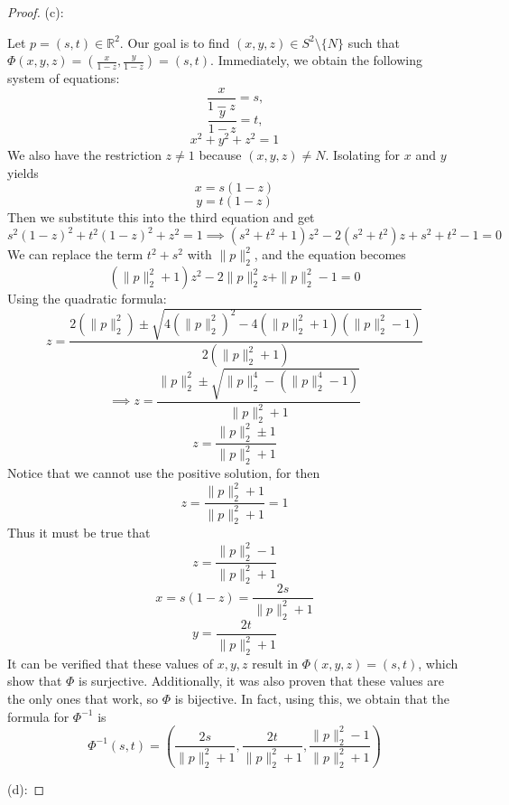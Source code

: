 \documentclass{article}
\theoremstyle{plain} %
\numberwithin{thm}{section} %
\theoremstyle{definition}
\begin{document}
\begin{proof}
            (c):

            Let \(p = (s,t) \in \mathbb{R}^2\). Our goal is to find \((x,y,z) \in S^2 \setminus \{N\}\) such that \(\Phi (x,y,z) = \left( \frac{x}{1-z}, \frac{y}{1-z} \right) = (s,t)\). Immediately, we obtain the following system of equations:
            \[
                \frac{x}{1-z} = s \text{,} 
            \]
            \[
                \frac{y}{1-z} = t \text{,} 
            \]
            \[
                x^2 + y^2 + z^2 = 1
            \]
            We also have the restriction \(z\neq 1\) because \((x,y,z) \neq N\). Isolating for \(x\) and \(y\) yields
            \[
                x=s(1-z)
            \]
            \[
                y=t(1-z)
            \]
            Then we substitute this into the third equation and get
            \[
                s^2(1-z)^2 + t^2(1-z)^2 + z^2 = 1 \implies (s^2 + t^2 + 1)z^2 - 2(s^2 + t^2)z + s^2 + t^2 - 1 = 0
            \]
            We can replace the term \(t^2 + s^2\) with \(\|p\| _2 ^2\), and the equation becomes
            \[
                (\|p\| _2 ^2 + 1)z^2 - 2\|p\| _2 ^2 z + \|p\| _2 ^2 - 1 = 0
            \]
            Using the quadratic formula:
            \[
                z = \frac{2(\|p\| _2 ^2) \pm \sqrt{4(\|p\| _2 ^2)^2 - 4(\|p\| _2 ^2 +1)(\|p\| _2 ^2 - 1)}}{2(\|p\| _2 ^2 + 1)}
            \]
            \[
                \implies z = \frac{\|p\| _2 ^2 \pm \sqrt{\|p\| _2 ^4 - (\|p\| _2 ^4 - 1)}}{\|p\| _2 ^2 + 1}
            \]
            \[
                z = \frac{\|p\| _2 ^2 \pm 1}{\|p\| _2 ^2 + 1}
            \]
            Notice that we cannot use the positive solution, for then
            \[
                z = \frac{\|p\| _2 ^2 + 1}{\|p\| _2 ^2 + 1} = 1
            \]
            Thus it must be true that
            \[
                z = \frac{\|p\| _2 ^2 - 1}{\|p\| _2 ^2 + 1}
            \]
            \[
                x = s(1-z) = \frac{2s}{\|p\| _2 ^2 + 1}
            \]
            \[
                y = \frac{2t}{\|p\| _2 ^2 + 1}
            \]
            It can be verified that these values of \(x,y,z\) result in \(\Phi (x,y,z) = (s,t)\), which show that \(\Phi\) is surjective. Additionally, it was also proven that these values are the only ones that work, so \(\Phi\) is bijective. In fact, using this, we obtain that the formula for \(\Phi ^{-1}\) is
            \[
                \Phi ^{-1} (s,t) = \left(\frac{2s}{\|p\| _2 ^2 + 1}, \frac{2t}{\|p\| _2 ^2 + 1}, \frac{\|p\| _2 ^2 - 1}{\|p\| _2 ^2 + 1}\right)
            \]

            (d):


\end{proof}
\end{document}
